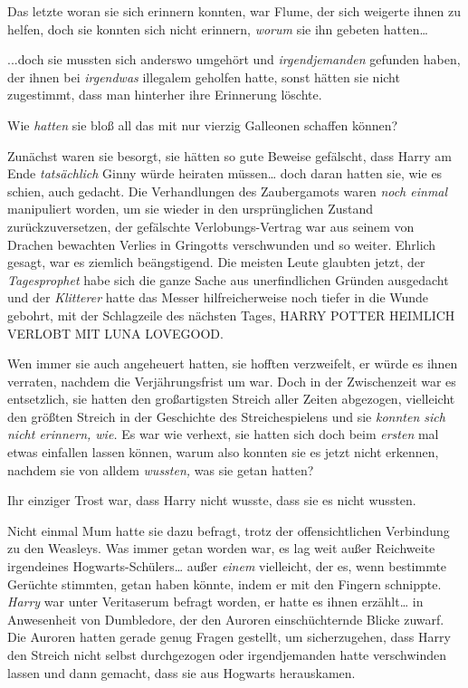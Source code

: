 {Das letzte woran sie sich erinnern konnten, war Flume, der sich weigerte ihnen zu helfen, doch sie konnten sich nicht erinnern, \emph{worum} sie ihn gebeten hatten…

...doch sie mussten sich anderswo umgehört und \emph{irgendjemanden} gefunden haben, der ihnen bei \emph{irgendwas} illegalem geholfen hatte, sonst hätten sie nicht zugestimmt, dass man hinterher ihre Erinnerung löschte.

Wie \emph{hatten} sie bloß all das mit nur vierzig Galleonen schaffen können?

Zunächst waren sie besorgt, sie hätten so gute Beweise gefälscht, dass Harry am Ende \emph{tatsächlich} Ginny würde heiraten müssen… doch daran hatten sie, wie es schien, auch gedacht. Die Verhandlungen des Zaubergamots waren \emph{noch einmal} manipuliert worden, um sie wieder in den ursprünglichen Zustand zurückzuversetzen, der gefälschte Verlobungs-Vertrag war aus seinem von Drachen bewachten Verlies in Gringotts verschwunden und so weiter. Ehrlich gesagt, war es ziemlich beängstigend. Die meisten Leute glaubten jetzt, der \emph{Tagesprophet} habe sich die ganze Sache aus unerfindlichen Gründen ausgedacht und der \emph{Klitterer} hatte das Messer hilfreicherweise noch tiefer in die Wunde gebohrt, mit der Schlagzeile des nächsten Tages, HARRY POTTER HEIMLICH VERLOBT MIT LUNA LOVEGOOD.

Wen immer sie auch angeheuert hatten, sie hofften verzweifelt, er würde es ihnen verraten, nachdem die Verjährungsfrist um war. Doch in der Zwischenzeit war es entsetzlich, sie hatten den großartigsten Streich aller Zeiten abgezogen, vielleicht den größten Streich in der Geschichte des Streichespielens und sie \emph{konnten sich nicht erinnern, wie.} Es war wie verhext, sie hatten sich doch beim \emph{ersten} mal etwas einfallen lassen können, warum also konnten sie es jetzt nicht erkennen, nachdem sie von alldem \emph{wussten,} was sie getan hatten?

Ihr einziger Trost war, dass Harry nicht wusste, dass sie es nicht wussten.

Nicht einmal Mum hatte sie dazu befragt, trotz der offensichtlichen Verbindung zu den Weasleys. Was immer getan worden war, es lag weit außer Reichweite irgendeines Hogwarts-Schülers… außer \emph{einem} vielleicht, der es, wenn bestimmte Gerüchte stimmten, getan haben könnte, indem er mit den Fingern schnippte. \emph{Harry} war unter Veritaserum befragt worden, er hatte es ihnen erzählt… in Anwesenheit von Dumbledore, der den Auroren einschüchternde Blicke zuwarf. Die Auroren hatten gerade genug Fragen gestellt, um sicherzugehen, dass Harry den Streich nicht selbst durchgezogen oder irgendjemanden hatte verschwinden lassen und dann gemacht, dass sie aus Hogwarts herauskamen.

}
